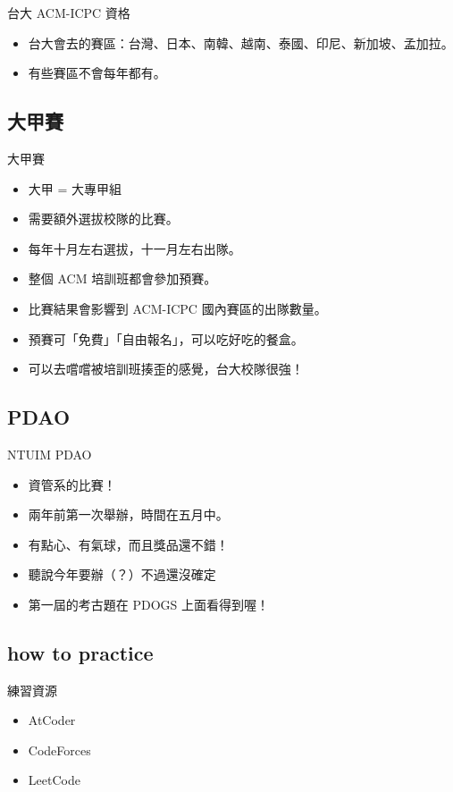 \documentclass[t]{beamer}
\begin{document}
\begin{frame}{台大 ACM-ICPC 資格}
  \begin{itemize}
    \item 台大會去的賽區：台灣、日本、南韓、越南、泰國、印尼、新加坡、孟加拉。
    \item 有些賽區不會每年都有。
  \end{itemize}
\end{frame}

\subsection{大甲賽}
\begin{frame}{大甲賽}
  \begin{itemize}
    \item 大甲 = 大專甲組
    \item 需要額外選拔校隊的比賽。
    \item 每年十月左右選拔，十一月左右出隊。
    \item 整個 ACM 培訓班都會參加預賽。
    \item 比賽結果會影響到 ACM-ICPC 國內賽區的出隊數量。
    \item 預賽可「免費」「自由報名」，可以吃好吃的餐盒。
    \item 可以去嚐嚐被培訓班揍歪的感覺，台大校隊很強！
  \end{itemize}
\end{frame}

\subsection{PDAO}
\begin{frame}{NTUIM PDAO}
  \begin{itemize}
    \item 資管系的比賽！
    \item 兩年前第一次舉辦，時間在五月中。
    \item 有點心、有氣球，而且獎品還不錯！
    \item 聽說今年要辦（？）不過還沒確定
    \item 第一屆的考古題在 PDOGS 上面看得到喔！
  \end{itemize}
\end{frame}

\subsection{how to practice}
\begin{frame}{練習資源}
  \begin{itemize}
    \item AtCoder
    \item CodeForces
    \item LeetCode
  \end{itemize}
\end{frame}
\end{document}
